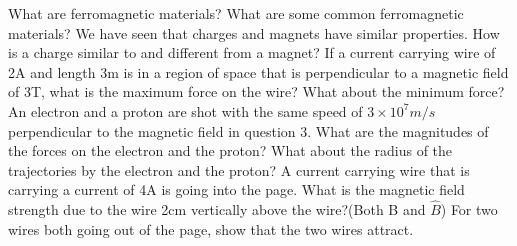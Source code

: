 \documentclass[12pt,addpoints]{exam}
\begin{document}
\begin{questions}
\begin{enumerate}[label=(\roman*)]
		\end{enumerate}
		\question What are ferromagnetic materials? What are some common ferromagnetic materials?\vspace{1.5in}
		\question We have seen that charges and magnets have similar properties. How is a charge similar to and different from a magnet?\vspace{1.5in}
		\question If a current carrying wire of 2A and length 3m is in a region of space that is perpendicular to a magnetic field of 3T, what is the maximum force on the wire? What about the minimum force?\vspace{1.5in}
		\question An electron and a proton are shot with the same speed of $3\times10^7m/s$ perpendicular to the magnetic field in question 3. What are the magnitudes of the forces on the electron and the proton? What about the radius of the trajectories by the electron and the proton?\vspace{2in}
		\question A current carrying wire that is carrying a current of 4A is going into the page. What is the magnetic field strength due to the wire 2cm vertically above the wire?(Both B and $\hat{B}$)\vspace{1.5in}
		\question For two wires both going out of the page, show that the two wires attract.\vspace{1.5in}\newpage

\end{questions}
\end{document}
